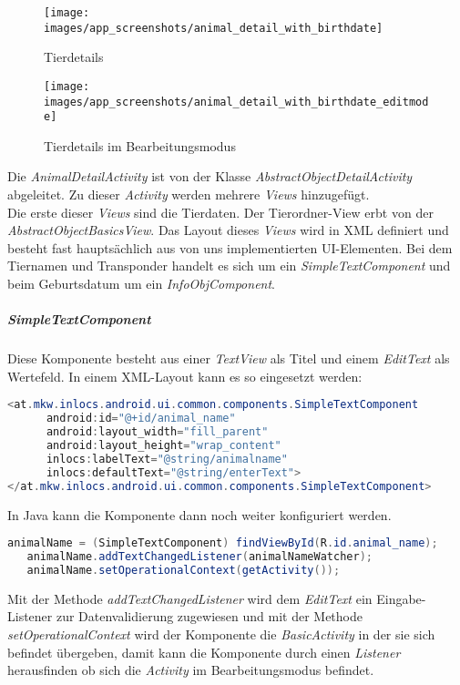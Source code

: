 \begin{figure}[H]
  \centering
  \begin{minipage}[t]{7 cm}
  	\texttt{[image: images/app\_screenshots/animal\_detail\_with\_birthdate]} 
    \caption{Tierdetails}
  \end{minipage}
  \hspace{0.5cm}
  \begin{minipage}[t]{7 cm}
	\texttt{[image: images/app\_screenshots/animal\_detail\_with\_birthdate\_editmode]}  
    \caption{Tierdetails im Bearbeitungsmodus}
  \end{minipage}
\end{figure}
Die \textit{AnimalDetailActivity} ist von der Klasse \textit{AbstractObjectDetailActivity} abgeleitet. Zu dieser \textit{Activity} werden mehrere \textit{Views} hinzugefügt. \\
Die erste dieser \textit{Views} sind die Tierdaten. Der Tierordner-View erbt von der \textit{AbstractObjectBasicsView}. Das Layout dieses \textit{Views} wird in XML definiert und besteht fast hauptsächlich aus von uns implementierten UI-Elementen. Bei dem Tiernamen und Transponder handelt es sich um ein \textit{SimpleTextComponent} und beim Geburtsdatum um ein \textit{InfoObjComponent}. \\
\subparagraph{SimpleTextComponent}
Diese Komponente besteht aus einer \textit{TextView} als Titel und einem \textit{EditText} als Wertefeld. In einem XML-Layout kann es so eingesetzt werden:
\begin{lstlisting}[language=java, captionpos=b, caption={SimpleTextComponent XML}]
<at.mkw.inlocs.android.ui.common.components.SimpleTextComponent 
      android:id="@+id/animal_name" 
      android:layout_width="fill_parent"
      android:layout_height="wrap_content" 
      inlocs:labelText="@string/animalname" 
      inlocs:defaultText="@string/enterText">
</at.mkw.inlocs.android.ui.common.components.SimpleTextComponent>
\end{lstlisting}
In Java kann die Komponente dann noch weiter konfiguriert werden.
\begin{lstlisting}[language=java, captionpos=b, caption={SimpleTextComponent in Java}]
   animalName = (SimpleTextComponent) findViewById(R.id.animal_name);
   animalName.addTextChangedListener(animalNameWatcher);
   animalName.setOperationalContext(getActivity());
\end{lstlisting}
Mit der Methode \textit{addTextChangedListener} wird dem \textit{EditText} ein Eingabe-Listener zur Datenvalidierung zugewiesen und mit der Methode \textit{setOperationalContext} wird der Komponente die \textit{BasicActivity} in der sie sich befindet übergeben, damit kann die Komponente durch einen \textit{Listener} herausfinden ob sich die \textit{Activity} im Bearbeitungsmodus befindet.
